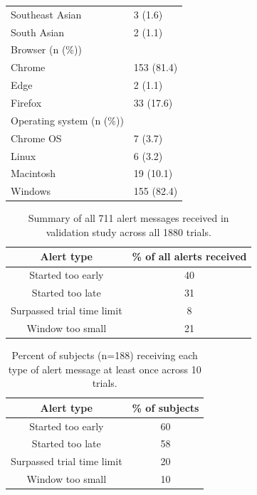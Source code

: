 \documentclass[]{article}
\begin{document}
\begin{table}[H]
\begin{tabular}{@{}ll@{}}
\hspace{6mm}Southeast Asian                               & 3 (1.6)       \\
\hspace{6mm}South Asian                                   & 2 (1.1)       \\ 
Browser (n (\%))                                               &               \\
\hspace{6mm}Chrome                       & 153 (81.4)    \\
\hspace{6mm}Edge                         & 2 (1.1)       \\
\hspace{6mm}Firefox                      & 33 (17.6)     \\ 
Operating system (n (\%))                                              &               \\
\hspace{6mm}Chrome OS                      & 7 (3.7)    \\
\hspace{6mm}Linux                         & 6 (3.2)        \\
\hspace{6mm}Macintosh                      & 19 (10.1)     \\
\hspace{6mm}Windows                      & 155 (82.4)     \\ \bottomrule
\end{tabular}
\end{table}

\begin{table}[H]
\centering
\caption{\label{tb:alerts_trial}Summary of all 711 alert messages received in validation study across all 1880 trials.}
\begin{tabular}{cc}
  \hline
 Alert type & \% of all alerts received\\ 
  \hline
Started too early & 40 \\ 
  Started too late & 31 \\ 
  Surpassed trial time limit & 8 \\ 
  Window too small & 21 \\ 
   \hline
\end{tabular}
\end{table}

\begin{table}[H]
\centering
\caption{\label{tb:alerts_subject}Percent of subjects (n=188) receiving each type of alert message at least once across 10 trials.}
\begin{tabular}{cc}
  \hline
Alert type & \% of subjects \\ 
  \hline
Started too early & 60 \\ 
  Started too late & 58 \\ 
  Surpassed trial time limit & 20 \\ 
  Window too small & 10 \\ 
   \hline
\end{tabular}
\end{table}
\end{document}
